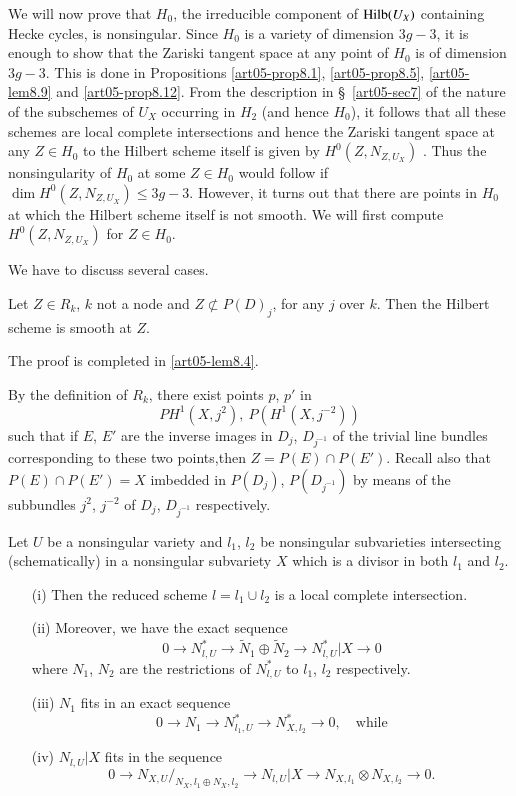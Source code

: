 We will now prove that $H_{0}$, the irreducible component of
$\operatorname{Hilb}(U_{X})$ containing Hecke cycles, is nonsingular. Since $H_{0}$
is a variety of dimension $3g-3$, it is enough to show that the
Zariski tangent space at any point of $H_{0}$ is of dimension
$3g-3$. This is done in
Propositions \ref{art05-prop8.1}, \ref{art05-prop8.5}, \ref{art05-lem8.9}
and \ref{art05-prop8.12}. From the description in \S\ \ref{art05-sec7}
of the nature of the subschemes of $U_{X}$ occurring in $H_{2}$ (and
hence $H_{0}$), it follows that all these schemes are local complete
intersections and hence the Zariski tangent space at any $Z\in H_{0}$
to the Hilbert scheme itself is given by
$H^{0}(Z,N_{Z,U_{X}})$ \cite{art05-key9a}. Thus the nonsingularity of
$H_{0}$ at some $Z\in H_{0}$ would follow if $\dim
H^{0}(Z,N_{Z,U_{X}})\leq 3g-3$. However, it turns out that there are
points in $H_{0}$ at which the Hilbert scheme itself is not smooth. We
will first compute $H^{0}(Z,N_{Z,U_{X}})$ for $Z\in H_{0}$. 

We have to discuss several cases.

\begin{proposition}\label{art05-prop8.1}
Let $Z\in R_{k}$, $k$ not a node and $Z\nsubset P(D)_{j}$, for any $j$
over $k$. Then the Hilbert scheme is smooth at $Z$.
\end{proposition}

The proof is completed in \ref{art05-lem8.4}.

By the definition of $R_{k}$, there exist points $p$, $p'$ in
$$
PH^{1}(X,j^{2}), \ P(H^{1}(X,j^{-2}))
$$ 
such that if $E$, $E'$ are the
inverse images in $D_{j}$, $D_{j^{-1}}$ of the trivial line bundles
corresponding to these two points,\pageoriginale then $Z=P(E)\cap
P(E')$. Recall also that $P(E)\cap P(E')=X$ imbedded in $P(D_{j})$,
$P(D_{j^{-1}})$ by means of the subbundles $j^{2}$, $j^{-2}$ of $D_{j}$,
$D_{j^{-1}}$ respectively.

\begin{lemma}\label{art05-lem8.2}
Let $U$ be a nonsingular variety and $l_{1}$, $l_{2}$ be nonsingular
subvarieties intersecting (schematically) in a nonsingular subvariety
$X$ which is a divisor in both $l_{1}$ and $l_{2}$.
\begin{itemize}
\item[\rm(i)] Then the reduced scheme $l=l_{1}\cup l_{2}$ is a local
complete intersection.

\item[\rm(ii)] Moreover, we have the exact sequence
$$
0\to N^{*}_{l,U}\to \widetilde{N}_{1}\oplus \widetilde{N}_{2}\to
N^{*}_{l,U}|X\to 0
$$
where $N_{1}$, $N_{2}$ are the restrictions of $N^{*}_{l,U}$ to
$l_{1}$, $l_{2}$ respectively. 

\item[\rm(iii)] $N_{1}$ fits in an exact sequence
$$
0\to N_{1}\to N^{*}_{l_{1},U}\to N^{*}_{X,l_{2}}\to 0,\quad\text{while}
$$

\item[\rm(iv)] $N_{l,U}|X$ fits in the sequence
$$
0\to N_{X,U}/_{N_{X},l_{1}\oplus N_{X},l_{2}}\to N_{l,U}|X\to
N_{X,l_{1}}\otimes N_{X,l_{2}}\to 0.
$$
\end{itemize}
\end{lemma}     

